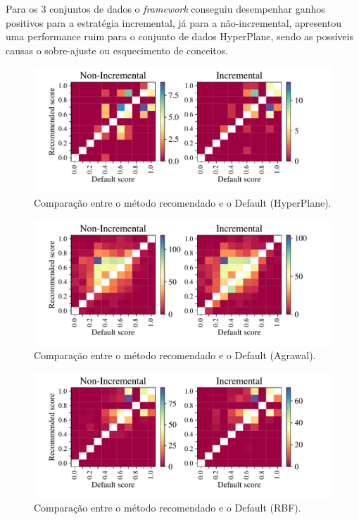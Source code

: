 \documentclass[conference,compsoc]{IEEEtran}
\begin{document}
Para os 3 conjuntos de dados o \textit{framework} conseguiu desempenhar ganhos positivos para a estratégia incremental, já para a não-incremental, apresentou uma performance ruim para o conjunto de dados HyperPlane, sendo as possíveis causas o sobre-ajuste ou esquecimento de conceitos.


\begin{figure}[ht]
    \centering
    \includegraphics[width=\linewidth]{imgs/hyper_score.pdf}
    \caption{Comparação entre o método recomendado e o Default (HyperPlane).}
    \label{fig:cross_score_hyper}
\end{figure}

\begin{figure}[ht]
    \centering
    \includegraphics[width=\linewidth]{imgs/agrawal_score.pdf}
    \caption{Comparação entre o método recomendado e o Default (Agrawal).}
    \label{fig:cross_score_agrawal}
\end{figure}


\begin{figure}[ht!]
    \centering
    \includegraphics[width=\linewidth]{imgs/rbf_score.pdf}
    \caption{Comparação entre o método recomendado e o Default (RBF).}
    \label{fig:cross_score_rbf}
\end{figure}
\end{document}
